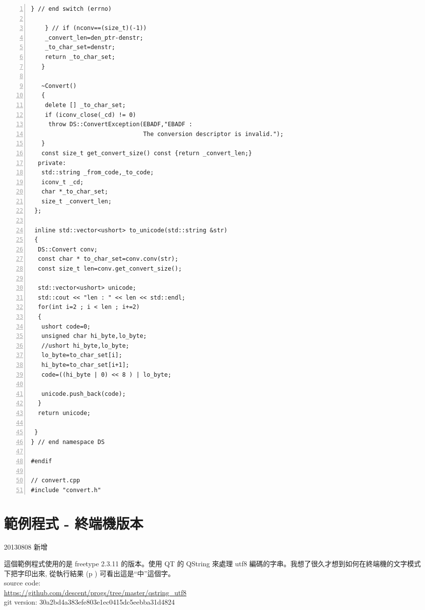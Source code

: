 \documentclass[12pt,a4]{article}
\begin{document}
\begin{CJK}{UTF8}{bsmi}
\begin{Verbatim}[commandchars=@\^?,numbers=left]
     } // end switch (errno)

    } // if (nconv==(size_t)(-1))
    _convert_len=den_ptr-denstr;
    _to_char_set=denstr;
    return _to_char_set;
   }

   ~Convert()
   {
    delete [] _to_char_set;
    if (iconv_close(_cd) != 0)
     throw DS::ConvertException(EBADF,"EBADF : 
                                The conversion descriptor is invalid.");
   }
   const size_t get_convert_size() const {return _convert_len;}
  private:
   std::string _from_code,_to_code;
   iconv_t _cd;
   char *_to_char_set;
   size_t _convert_len;
 };

 inline std::vector<ushort> to_unicode(std::string &str)
 {
  DS::Convert conv;
  const char * to_char_set=conv.conv(str);
  const size_t len=conv.get_convert_size();

  std::vector<ushort> unicode;
  std::cout << "len : " << len << std::endl;
  for(int i=2 ; i < len ; i+=2)
  {
   ushort code=0;
   unsigned char hi_byte,lo_byte;
   //ushort hi_byte,lo_byte;
   lo_byte=to_char_set[i];
   hi_byte=to_char_set[i+1];
   code=((hi_byte | 0) << 8 ) | lo_byte;

   unicode.push_back(code);
  }
  return unicode;

 }
} // end namespace DS

#endif

// convert.cpp
#include "convert.h"
\end{Verbatim}

\newpage
\section{範例程式 - 終端機版本}
20130808 新增 

這個範例程式使用的是 freetype 2.3.11 的版本。使用 QT 的 QString 來處理 utf8
編碼的字串。我想了很久才想到如何在終端機的文字模式下把字印出來, 從執行結果 (p \pageref{lst::result})
可看出這是``中''這個字。\\
source code:\\
\href{https://github.com/descent/progs/tree/master/qstring_utf8}{https://github.com/descent/progs/tree/master/qstring\_{}utf8}\\
git version: 30a2bd4a383efe803e1ec0415dc5eebba31d4824




\end{CJK}
\end{document}
